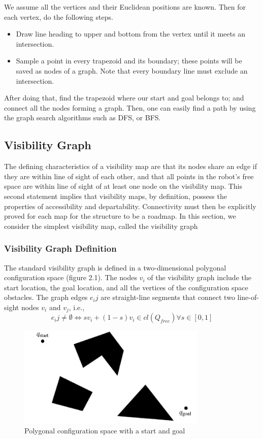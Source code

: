 \documentclass[11pt]{article}
\begin{document}
We assume all the vertices and their Euclidean positions are known. Then for each vertex, do the following steps.
\begin{itemize}
  \item Draw line heading to upper and bottom from the vertex until it meets an intersection.
  \item Sample a point in every trapezoid and its boundary; these points will be saved as nodes of a graph. Note that every boundary line must exclude an intersection.
\end{itemize}
After doing that, find the trapezoid where our start and goal belongs to; and connect all the nodes forming a graph. Then, one can easily find a path by using the graph search algorithms such as DFS, or BFS.

\subsection{Visibility Graph}

The defining characteristics of a visibility map are that its nodes share an edge if they are within line of sight of each other, and that all points in the robot's free space are within line of sight of at least one node on the visibility map. This second statement implies that visibility maps, by definition, possess the properties of accessibility and departability. Connectivity must then be explicitly proved for each map for the structure to be a roadmap. In this section, we consider the simplest visibility map, called the visibility graph

\subsubsection{Visibility Graph Definition}


The standard visibility graph is defined in a two-dimensional polygonal configuration space (figure 2.1). The nodes $v_i$ of the visibility graph include the start location, the goal location, and all the vertices of the configuration space obstacles. The graph edges $e_ij$ are straight-line segments that connect two line-of-sight nodes $v_i$ and $v_j$, i.e.,
$$e_ij \ne \emptyset \Longleftrightarrow sv_i + (1-s)v_i \in cl(Q_{free})   \forall s \in [0,1] $$
\begin{figure}[h]
\centering
\includegraphics[width=9cm]{imgs/Polygonal_configuration_space.png}
\caption{Polygonal configuration space with a start and goal}
\end{figure}
\end{document}
